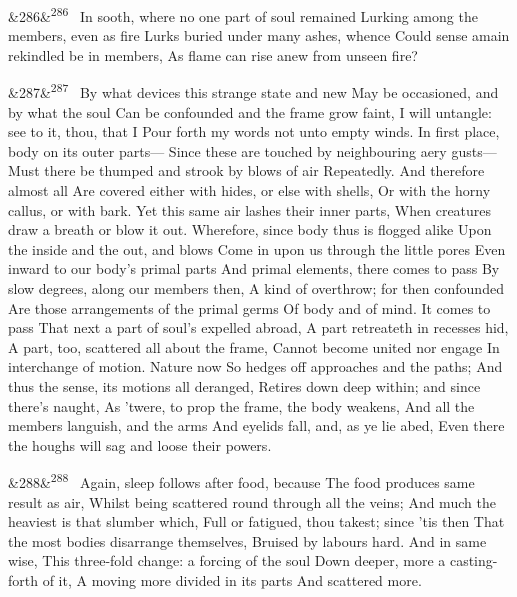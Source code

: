 \documentclass[12pt]{article}
\newcommand{\para}[1][]{\par\noindent\ifx&#1&\else\textsuperscript{\footnotesize #1}~\fi}
\begin{document}
\para[286] In sooth, where no one part of soul remained Lurking among the members, even as fire Lurks buried under many ashes, whence Could sense amain rekindled be in members, As flame can rise anew from unseen fire?

\para[287] By what devices this strange state and new May be occasioned, and by what the soul Can be confounded and the frame grow faint, I will untangle: see to it, thou, that I Pour forth my words not unto empty winds. In first place, body on its outer parts--- Since these are touched by neighbouring aery gusts--- Must there be thumped and strook by blows of air Repeatedly. And therefore almost all Are covered either with hides, or else with shells, Or with the horny callus, or with bark. Yet this same air lashes their inner parts, When creatures draw a breath or blow it out. Wherefore, since body thus is flogged alike Upon the inside and the out, and blows Come in upon us through the little pores Even inward to our body's primal parts And primal elements, there comes to pass By slow degrees, along our members then, A kind of overthrow; for then confounded Are those arrangements of the primal germs Of body and of mind. It comes to pass That next a part of soul's expelled abroad, A part retreateth in recesses hid, A part, too, scattered all about the frame, Cannot become united nor engage In interchange of motion. Nature now So hedges off approaches and the paths; And thus the sense, its motions all deranged, Retires down deep within; and since there's naught, As 'twere, to prop the frame, the body weakens, And all the members languish, and the arms And eyelids fall, and, as ye lie abed, Even there the houghs will sag and loose their powers.

\para[288] Again, sleep follows after food, because The food produces same result as air, Whilst being scattered round through all the veins; And much the heaviest is that slumber which, Full or fatigued, thou takest; since 'tis then That the most bodies disarrange themselves, Bruised by labours hard. And in same wise, This three-fold change: a forcing of the soul Down deeper, more a casting-forth of it, A moving more divided in its parts And scattered more.
\end{document}
